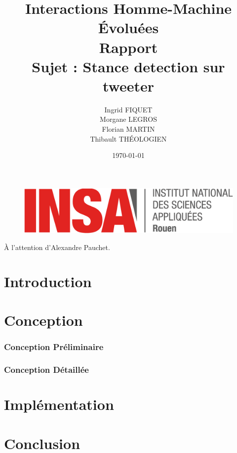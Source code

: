 \documentclass[a4paper,12pt]{article}
\title{\huge Interactions Homme-Machine Évoluées\\Rapport\\Sujet : Stance detection sur tweeter}
\author{Ingrid FIQUET\\Morgane LEGROS\\Florian MARTIN\\Thibault THÉOLOGIEN}
\date{\today}
\begin{document}
	\begin{titlepage}
		\vfill
		\begin{figure}
			\includegraphics[scale=0.3]{img/logoINSARouen.png}
		\end{figure}

		\maketitle


    \begin{center}
    \LARGE
      \addvspace{10mm}
      À l'attention d'Alexandre Pauchet.
    \end{center}

		\vfill
		\noindent \hrulefill

	\end{titlepage}



\newpage
\tableofcontents{}

\newpage
\part{Introduction}
	


\newpage
\part{Conception}

\section{Conception Préliminaire}
	


\section{Conception Détaillée}
	


\newpage
\part{Implémentation}
	


\newpage
\part{Conclusion}
	
\end{document}
